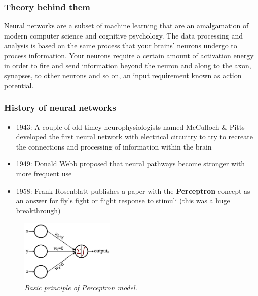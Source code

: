 \documentclass[
]{article}
\providecommand{\tightlist}{%
  \setlength{\itemsep}{0pt}\setlength{\parskip}{0pt}}
\begin{document}
\hypertarget{theory-behind-them}{%
\subsubsection{Theory behind them}\label{theory-behind-them}}

Neural networks are a subset of machine learning that are an
amalgamation of modern computer science and cognitive psychology. The
data processing and analysis is based on the same process that your
brains' neurons undergo to process information. Your neurons require a
certain amount of activation energy in order to fire and send
information beyond the neuron and along to the axon, synapses, to other
neurons and so on, an input requirement known as action potential.

\hypertarget{history-of-neural-networks}{%
\subsubsection{History of neural
networks}\label{history-of-neural-networks}}

\begin{itemize}
\tightlist
\item
  1943: A couple of old-timey neurophysiologists named McCulloch \&
  Pitts developed the first neural network with electrical circuitry to
  try to recreate the connections and processing of information within
  the brain
\item
  1949: Donald Webb proposed that neural pathways become stronger with
  more frequent use
\item
  1958: Frank Rosenblatt publishes a paper with the \textbf{Perceptron}
  concept as an answer for fly's fight or flight response to stimuli
  (this was a huge breakthrough)
\end{itemize}

\begin{figure}
\centering
\includegraphics[width=0.4\textwidth,height=\textheight]{media/perceptron.jpeg}
\caption{\emph{Basic principle of Perceptron model.}}
\end{figure}
\end{document}

